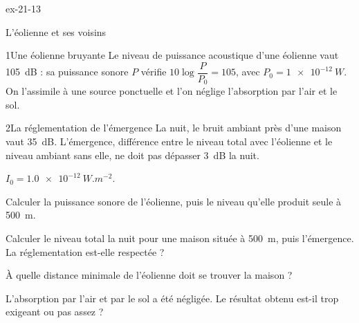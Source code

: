 \begin{blocLivre}{ex-21-13}
\begin{exercice}[3]{L'éolienne et ses voisins}
\begin{docu}{1}{Une éolienne bruyante}
Le niveau de puissance acoustique d'une éolienne vaut \qty{105}{dB} : sa puissance sonore $P$ vérifie
$10\log\dfrac{P}{P_0}=105$, avec $P_0=\qty{1e-12}{W}$. On l'assimile à une source ponctuelle et l'on néglige l'absorption
par l'air et le sol.
\end{docu}
\begin{docu}{2}{La réglementation de l'émergence}
La nuit, le bruit ambiant près d'une maison vaut \qty{35}{dB}. L'émergence, différence entre le niveau total avec
l'éolienne et le niveau ambiant sans elle, ne doit pas dépasser \qty{3}{dB} la nuit.
\end{docu}
\begin{donnees}
$I_0=\qty{1,0e-12}{W.m^{-2}}$.
\end{donnees}
\begin{questions}
\item Calculer la puissance sonore de l'éolienne, puis le niveau qu'elle produit seule à \qty{500}{m}.
\item Calculer le niveau total la nuit pour une maison située à \qty{500}{m}, puis l'émergence. La réglementation est-elle
respectée ?
\item \initiative À quelle distance minimale de l'éolienne doit se trouver la maison ?
\item L'absorption par l'air et par le sol a été négligée. Le résultat obtenu est-il trop exigeant ou pas assez ?
\end{questions}
\end{exercice}
\end{blocLivre}
